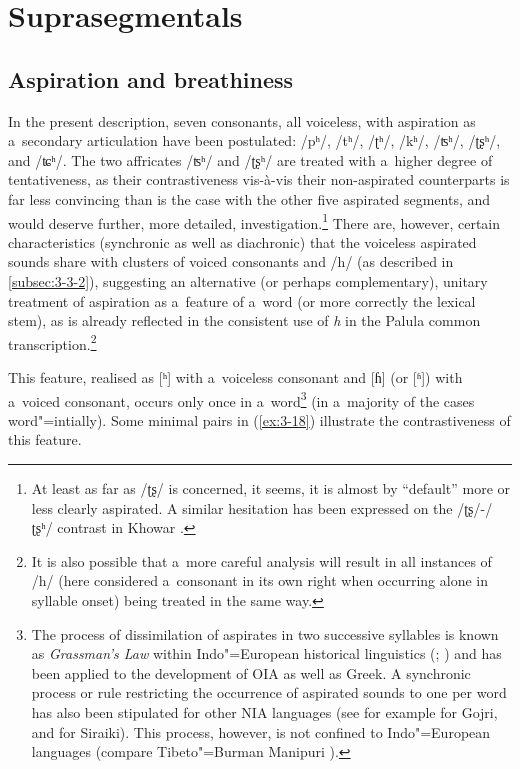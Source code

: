 \section{Suprasegmentals}
\label{sec:3-4}

\subsection{Aspiration and breathiness}
\label{subsec:3-4-1}

In the present description, seven consonants, all voiceless, with aspiration as a~secondary articulation have been postulated: /pʰ/, /tʰ/, /ʈʰ/, /kʰ/, /ʦʰ/, /ʈʂʰ/, and /ʨʰ/. The two affricates /ʦʰ/ and /ʈʂʰ/ are treated with a~higher degree of tentativeness, as their contrastiveness vis-à-vis their non-aspirated counterparts is far less convincing than is the case with the other five aspirated segments, and would deserve further, more detailed, investigation.\footnote{At least as far as /ʈʂ/ is concerned, it seems, it is almost by ``default'' more or less clearly aspirated. A similar hesitation has been expressed on the /ʈʂ/-/ʈʂʰ/ contrast in Khowar \citep[239]{endresenkristiansen1981}.} There are, however, certain characteristics (synchronic as well as diachronic) that the voiceless aspirated sounds share with clusters of voiced consonants and /h/ (as described in \ref{subsec:3-3-2}), suggesting an alternative (or perhaps complementary), unitary treatment of aspiration as a~feature of a~word (or more correctly the lexical stem), as is already reflected in the consistent use of \textit{h} in the Palula common transcription.\footnote{It is also possible that a~more careful analysis will result in all instances of /h/ (here considered a~consonant in its own right when occurring alone in syllable onset) being treated in the same way.} 


This feature, realised as [ʰ] with a~voiceless consonant and [ɦ] (or [ʱ]) with a~voiced consonant, occurs only once in a~word\footnote{\label{fnt:ftn32} The process of dissimilation of aspirates in two successive syllables is known as \textit{Grassman's Law} within Indo"=European historical linguistics (\citealt[19, 56]{szemerenyi1996}; \citealt[153--154, 162--163]{lehmann1992}) and has been applied to the development of OIA as well as Greek. A synchronic process or rule restricting the occurrence of aspirated sounds to one per word has also been stipulated for other NIA languages (see for example \citet[32]{losey2002} for Gojri, and \citet[34--35]{shackle1976} for Siraiki). This process, however, is not confined to Indo"=European languages (compare Tibeto"=Burman Manipuri \citep[13--14]{bhatningomba1997}).} (in a~majority of the cases word"=intially). Some minimal pairs in (\ref{ex:3-18}) illustrate the contrastiveness of this feature.


